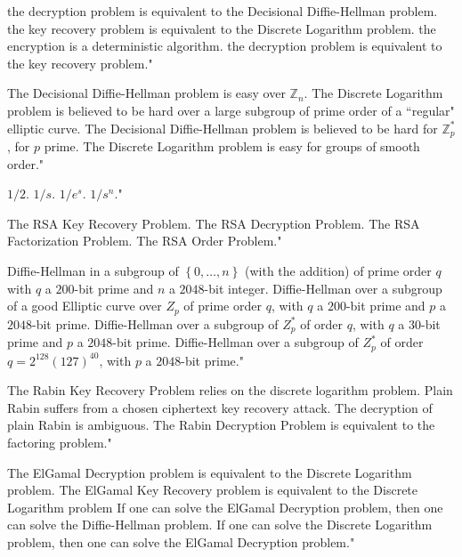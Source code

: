 {the decryption problem is equivalent to the Decisional Diffie-Hellman problem.}
{the key recovery problem is equivalent to the Discrete Logarithm problem.}
{the encryption is a deterministic algorithm.}
{the decryption problem is equivalent to the key recovery problem."}

{The Decisional Diffie-Hellman problem is easy over $\mathbb{Z}_n$.}
{The Discrete Logarithm problem is believed to be hard over a large subgroup of prime order of a ``regular" elliptic curve.}
{The Decisional Diffie-Hellman problem is believed to be hard for $\mathbb{Z}_p^*$, for $p$ prime.}
{The Discrete Logarithm problem is easy for groups of smooth order."}

{$1/2$.}
{$1/s$.}
{$1/e^s$.}
{$1/s^n$."}

{The RSA Key Recovery Problem.}
{The RSA Decryption Problem.}
{The RSA Factorization Problem.}
{The RSA Order Problem."}

{Diffie-Hellman in a subgroup of $\left\{ 0,\dots,n \right\}$ (with the addition) of prime order $q$ with $q$ a $200$-bit prime and $n$ a $2048$-bit integer.}
{Diffie-Hellman over a subgroup of a good Elliptic curve over $Z_p$ of prime order $q$, with $q$ a $200$-bit prime and $p$ a $2048$-bit prime.}
{Diffie-Hellman over a subgroup of $Z_p^*$ of order $q$, with $q$ a $30$-bit prime and $p$ a $2048$-bit prime.}
{Diffie-Hellman over a subgroup of $Z_p^*$ of order $q=2^{128}(127)^{40}$, with $p$ a $2048$-bit prime."}

{The Rabin Key Recovery Problem relies on the discrete logarithm problem.}
{Plain Rabin suffers from a chosen ciphertext key recovery attack.}
{The decryption of plain Rabin is ambiguous.}
{The Rabin Decryption Problem is equivalent to the factoring problem."}

{The ElGamal Decryption problem is equivalent to the Discrete Logarithm problem.}
{The ElGamal Key Recovery problem is equivalent to the Discrete Logarithm problem}
{If one can solve the ElGamal Decryption problem, then one can solve the Diffie-Hellman problem.}
{If one can solve the Discrete Logarithm problem, then one can solve the ElGamal Decryption problem."}

